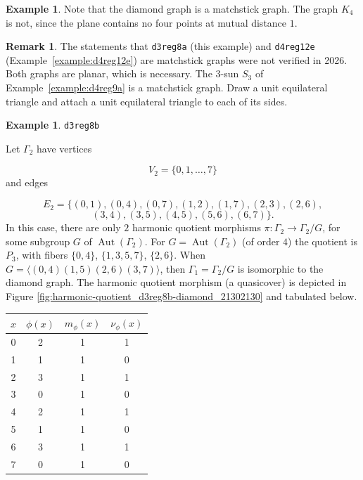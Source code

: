 \documentclass[12pt,letterpaper]{article}
\theoremstyle{definition}
\newtheorem{example}[theorem]{Example}
\newtheorem{revremark}{Remark}
\DeclareMathOperator{\Aut}{Aut}
\begin{document}
\begin{example}
{Note that the diamond graph is a matchstick graph. The graph $K_4$ is not,
since the plane contains no four points at mutual distance $1$.

\begin{revremark}
\label{rem:matchstick}
The statements that {\tt d3reg8a} (this example) and
{\tt d4reg12e} (Example~\ref{example:d4reg12e}) are matchstick graphs were
not verified in 2026. Both graphs are planar, which is necessary. The
$3$-sun $S_3$ of Example~\ref{example:d4reg9a} is a matchstick graph. Draw
a unit equilateral triangle and attach a unit equilateral triangle to each
of its sides.
\end{revremark}
}
\end{example}



\begin{example}%
\label{example:d3reg8b}
    {\tt d3reg8b}\newline
{\rm  
Let $\Gamma_2$ have vertices

\[
V_2=\{0,1,\dots,7\}
\]
and edges

\[
E_2 = \{(0, 1), (0, 4), (0, 7), (1, 2), (1, 7), (2, 3), (2, 6),
\]
\[
(3, 4), (3, 5), (4, 5), (5, 6), (6, 7)\}.
\]
In this case, there are only $2$ harmonic quotient morphisms
$\pi: \Gamma_2\to \Gamma_2/G$, for some subgroup
$G$ of $\Aut(\Gamma_2)$. For $G=\Aut(\Gamma_2)$ (of order $4$) the quotient is
$P_3$, with fibers $\{0,4\}$, $\{1,3,5,7\}$, $\{2,6\}$.
When $G=\langle (0,4)(1,5)(2,6)(3,7)\rangle$, then
$\Gamma_1=\Gamma_2/G$ is isomorphic to the diamond graph.
The harmonic quotient morphism (a quasicover) is depicted in
Figure \ref{fig:harmonic-quotient_d3reg8b-diamond_21302130}
and tabulated below.

\begin{center}
\begin{tabular}{c|c|c|c}  
  $x$ & $\phi(x)$ & $m_\phi(x)$ & $\nu_\phi(x)$ \\ \hline
  0   &    2   &        1         &  1   \\
  1   &    1   &        1         &  0   \\
  2   &    3   &        1         &  1   \\
  3   &    0   &        1         &  0   \\
  4   &    2   &        1         &  1   \\
  5   &    1   &        1         &  0   \\
  6   &    3   &        1         &  1   \\
  7   &    0   &        1         &  0   \\
\end{tabular}
\end{center}

}
\end{example}
\end{document}
